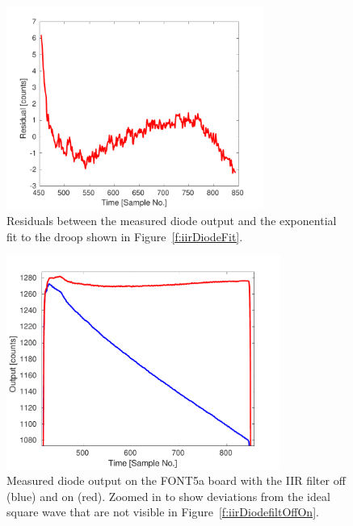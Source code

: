 \begin{figure}
  \centering
  \includegraphics[width=0.75\textwidth]{Figures/commissioning/iirDiodeFitResid}
  \caption{Residuals between the measured diode output and the exponential fit to the droop shown in Figure~\ref{f:iirDiodeFit}.}
  \label{f:iirDiodeFitResid}
\end{figure}

\begin{figure}
  \centering
  \includegraphics[width=0.8\textwidth]{Figures/commissioning/iirDiodeFiltOffOn_zoom}
  \caption{Measured diode output on the FONT5a board with the IIR filter off (blue) and on (red). Zoomed in to show deviations from the ideal square wave that are not visible in Figure~\ref{f:iirDiodefiltOffOn}.}
  \label{f:iirDiodefiltOffOn_zoom}
\end{figure}

